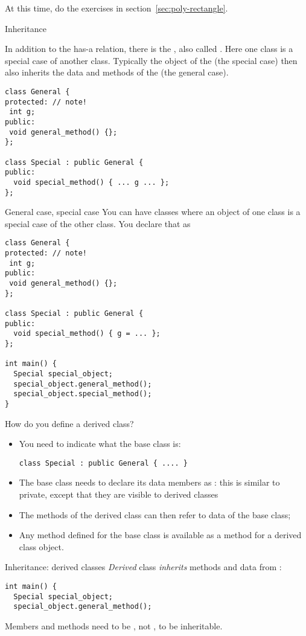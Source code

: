 At this time, do the exercises in section~\ref{sec:poly-rectangle}.

 {Inheritance}
\label{sec:inheritance}

In addition to the has-a relation, there is the , also called . Here one class is
a special case of another class.
Typically the object of the  (the special
case) then also inherits the data and methods of the
 (the general case).
\begin{verbatim}
class General {
protected: // note!
 int g;
public:
 void general_method() {};
};

class Special : public General {
public:
  void special_method() { ... g ... };
};
\end{verbatim}

\begin{slide}{General case, special case}
  \label{sl:obj-case}
  You can have classes where an object of one class is a special case of
  the other class. You declare that as
\begin{verbatim}
class General {
protected: // note!
 int g;
public:
 void general_method() {};
};

class Special : public General {
public:
  void special_method() { g = ... };
};

int main() {
  Special special_object;
  special_object.general_method();
  special_object.special_method();
}
\end{verbatim}
\end{slide}

How do you define a derived class?
\begin{itemize}
\item You need to indicate what the base class is:
\begin{verbatim}
class Special : public General { .... }
\end{verbatim}
\item The base class needs to declare its data members as
  : this is similar to private, except that
  they are visible to derived classes
\item The methods of the derived class can then refer to data of the
  base class;
\item Any method defined for the base class is available as a method
  for a derived class object.
\end{itemize}

\begin{slide}{Inheritance: derived classes}
  \label{sl:obj-derive}
  \emph{Derived} class 
  \emph{inherits} methods and data from
   :
\begin{verbatim}
int main() {
  Special special_object;
  special_object.general_method();
\end{verbatim}
Members and methods need to be , not , to be inheritable.
\end{slide}

